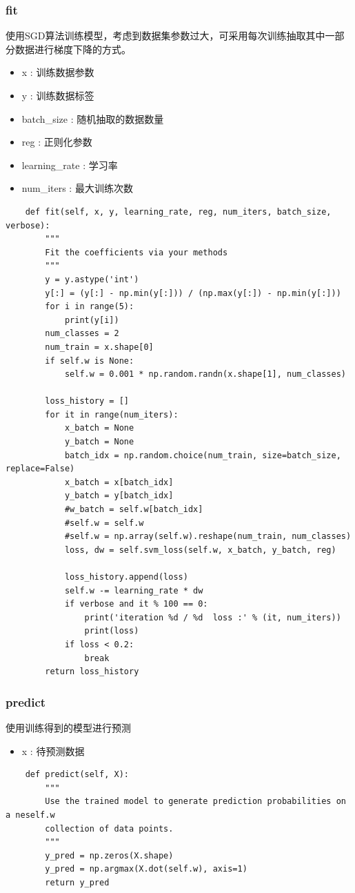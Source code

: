 \documentclass[12pt, a4paper, oneside]{ctexart}
\begin{document}
\subsubsection*{fit}
使用SGD算法训练模型，考虑到数据集参数过大，可采用每次训练抽取其中一部分数据进行梯度下降的方式。
\begin{itemize}
    \item x : 训练数据参数
    \item y : 训练数据标签
    \item batch\_size : 随机抽取的数据数量
    \item reg : 正则化参数
    \item learning\_rate : 学习率
    \item num\_iters : 最大训练次数
\end{itemize}
\begin{lstlisting}
    def fit(self, x, y, learning_rate, reg, num_iters, batch_size, verbose):
        """
        Fit the coefficients via your methods
        """ 
        y = y.astype('int')
        y[:] = (y[:] - np.min(y[:])) / (np.max(y[:]) - np.min(y[:]))
        for i in range(5):
            print(y[i])
        num_classes = 2
        num_train = x.shape[0]
        if self.w is None:
            self.w = 0.001 * np.random.randn(x.shape[1], num_classes)
            
        loss_history = []
        for it in range(num_iters):
            x_batch = None
            y_batch = None
            batch_idx = np.random.choice(num_train, size=batch_size, replace=False)
            x_batch = x[batch_idx]
            y_batch = y[batch_idx]
            #w_batch = self.w[batch_idx]
            #self.w = self.w
            #self.w = np.array(self.w).reshape(num_train, num_classes)
            loss, dw = self.svm_loss(self.w, x_batch, y_batch, reg)

            loss_history.append(loss)
            self.w -= learning_rate * dw
            if verbose and it % 100 == 0:
                print('iteration %d / %d  loss :' % (it, num_iters))
                print(loss)
            if loss < 0.2:
                break
        return loss_history    
\end{lstlisting}

\subsubsection*{predict}
使用训练得到的模型进行预测
\begin{itemize}
    \item x : 待预测数据
\end{itemize}
\begin{lstlisting}
    def predict(self, X):
        """
        Use the trained model to generate prediction probabilities on a neself.w
        collection of data points.
        """
        y_pred = np.zeros(X.shape)
        y_pred = np.argmax(X.dot(self.w), axis=1)
        return y_pred
\end{lstlisting}
\end{document}
